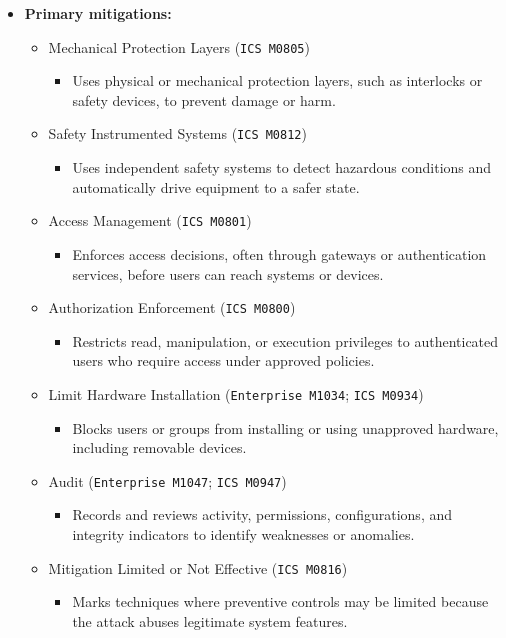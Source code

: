 \documentclass[10pt,a4paper,oneside]{report}
\begin{document}
\begin{itemize}
\item \textbf{Primary mitigations:}
\begin{itemize}
\item Mechanical Protection Layers (\texttt{ICS M0805})
\begin{itemize}
\item Uses physical or mechanical protection layers, such as interlocks or safety devices, to prevent damage or harm.
\end{itemize}
\item Safety Instrumented Systems (\texttt{ICS M0812})
\begin{itemize}
\item Uses independent safety systems to detect hazardous conditions and automatically drive equipment to a safer state.
\end{itemize}
\item Access Management (\texttt{ICS M0801})
\begin{itemize}
\item Enforces access decisions, often through gateways or authentication services, before users can reach systems or devices.
\end{itemize}
\item Authorization Enforcement (\texttt{ICS M0800})
\begin{itemize}
\item Restricts read, manipulation, or execution privileges to authenticated users who require access under approved policies.
\end{itemize}
\item Limit Hardware Installation (\texttt{Enterprise M1034}; \texttt{ICS M0934})
\begin{itemize}
\item Blocks users or groups from installing or using unapproved hardware, including removable devices.
\end{itemize}
\item Audit (\texttt{Enterprise M1047}; \texttt{ICS M0947})
\begin{itemize}
\item Records and reviews activity, permissions, configurations, and integrity indicators to identify weaknesses or anomalies.
\end{itemize}
\item Mitigation Limited or Not Effective (\texttt{ICS M0816})
\begin{itemize}
\item Marks techniques where preventive controls may be limited because the attack abuses legitimate system features.
\end{itemize}
\end{itemize}
\end{itemize}
\end{document}
